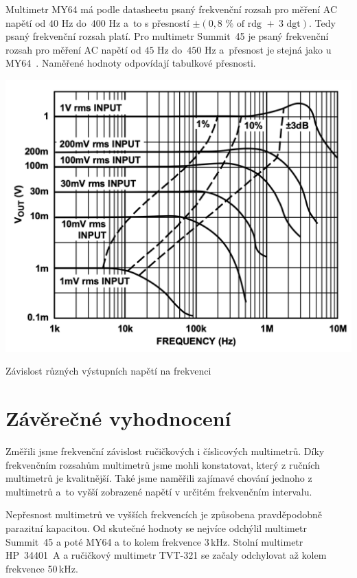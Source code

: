 \documentclass[a4paper,12pt]{article}   %
\begin{document}
Multimetr MY64 má podle datasheetu psaný frekvenční rozsah pro měření AC napětí od $40 \textrm{~Hz}$ do~$400\textrm{~Hz}$ a~to s přesností $\pm(0,8\textrm{~\%~of~rdg~}+~3\textrm{~dgt})$. Tedy psaný frekvenční rozsah platí. Pro multimetr Summit~45 je psaný frekvenční rozsah pro měření AC napětí od $45 \textrm{~Hz}$ do~$450\textrm{~Hz}$ a~přesnost je stejná jako u MY64~\cite{datasheet_multimetry}. Naměřené hodnoty odpovídají tabulkové přesnosti.

\begin{graf}
    \centering
    \includegraphics[width=.6\textwidth]{freq_zavisl.png}
    \caption{Závislost různých výstupních napětí na frekvenci \cite{datasheet_graf}}
    \label{datasheet}
\end{graf}
\section{Závěrečné vyhodnocení}
Změřili jsme frekvenční závislost ručičkových i číslicových multimetrů. Díky frekvenčním rozsahům multimetrů jsme mohli konstatovat, který z ručních multimetrů je kvalitnější. Také jsme naměřili zajímavé chování jednoho z multimetrů a~to vyšší zobrazené napětí v určitém frekvenčním intervalu.

Nepřesnost multimetrů ve vyšších frekvencích je způsobena pravděpodobně parazitní kapacitou. Od skutečné hodnoty se nejvíce odchýlil multimetr Summit~45 a poté MY64 a to kolem frekvence 3\,kHz. Stolní multimetr HP~34401~A a ručičkový multimetr TVT-321 se začaly odchylovat až kolem frekvence 50\,kHz.


\clearpage
\renewcommand{\refname}{Seznam použité literatury a~zdrojů informací} 
\end{document}
